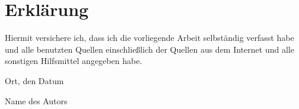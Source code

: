 \thispagestyle{empty}

\vspace*{4cm}
\section*{Erklärung}

Hiermit versichere ich, dass ich die vorliegende Arbeit selbständig verfasst habe und alle benutzten Quellen einschließlich der Quellen aus dem Internet und alle sonstigen Hilfsmittel angegeben habe.\vspace{20pt}

\noindent
Ort, den Datum\vspace{30pt}


\noindent
Name des Autors
